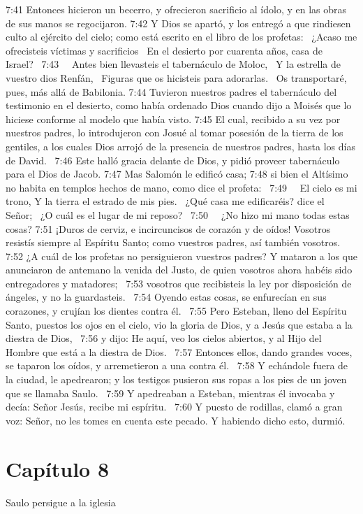 7:41 Entonces hicieron un becerro, y ofrecieron sacrificio al ídolo, y en las obras de sus manos se regocijaron. 
7:42 Y Dios se apartó, y los entregó a que rindiesen culto al ejército del cielo; como está escrito en el libro de los profetas:  
¿Acaso me ofrecisteis víctimas y sacrificios  
En el desierto por cuarenta años, casa de Israel?  
7:43   Antes bien llevasteis el tabernáculo de Moloc,  
Y la estrella de vuestro dios Renfán,  
Figuras que os hicisteis para adorarlas.  
Os transportaré, pues, más allá de Babilonia. 
7:44 Tuvieron nuestros padres el tabernáculo del testimonio en el desierto, como había ordenado Dios cuando dijo a Moisés que lo hiciese conforme al modelo que había visto. 
7:45 El cual, recibido a su vez por nuestros padres, lo introdujeron con Josué al tomar posesión de la tierra de los gentiles, a los cuales Dios arrojó de la presencia de nuestros padres, hasta los días de David.  
7:46 Este halló gracia delante de Dios, y pidió proveer tabernáculo para el Dios de Jacob. 
7:47 Mas Salomón le edificó casa; 
7:48 si bien el Altísimo no habita en templos hechos de mano, como dice el profeta:  
7:49   El cielo es mi trono, 
Y la tierra el estrado de mis pies.  
¿Qué casa me edificaréis? dice el Señor;  
¿O cuál es el lugar de mi reposo?  
7:50   ¿No hizo mi mano todas estas cosas? 
7:51 ¡Duros de cerviz, e incircuncisos de corazón y de oídos! Vosotros resistís siempre al Espíritu Santo; como vuestros padres, así también vosotros. 
7:52 ¿A cuál de los profetas no persiguieron vuestros padres? Y mataron a los que anunciaron de antemano la venida del Justo, de quien vosotros ahora habéis sido entregadores y matadores;  
7:53 vosotros que recibisteis la ley por disposición de ángeles, y no la guardasteis.  
7:54 Oyendo estas cosas, se enfurecían en sus corazones, y crujían los dientes contra él.  
7:55 Pero Esteban, lleno del Espíritu Santo, puestos los ojos en el cielo, vio la gloria de Dios, y a Jesús que estaba a la diestra de Dios,  
7:56 y dijo: He aquí, veo los cielos abiertos, y al Hijo del Hombre que está a la diestra de Dios.  
7:57 Entonces ellos, dando grandes voces, se taparon los oídos, y arremetieron a una contra él.  
7:58 Y echándole fuera de la ciudad, le apedrearon; y los testigos pusieron sus ropas a los pies de un joven que se llamaba Saulo.  
7:59 Y apedreaban a Esteban, mientras él invocaba y decía: Señor Jesús, recibe mi espíritu.  
7:60 Y puesto de rodillas, clamó a gran voz: Señor, no les tomes en cuenta este pecado. Y habiendo dicho esto, durmió.  
\section*{Capítulo 8}
Saulo persigue a la iglesia  

